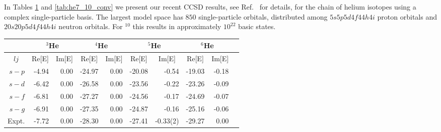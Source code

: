 \documentclass{ws-procs975x65}
\begin{document}
In Tables  \ref{tab:he3_6_conv} and \ref{tab:he7_10_conv}  we present our recent CCSD results, 
see Ref.~\cite{hagen3} for details, 
for the chain
of helium isotopes using a complex single-particle basis.   The largest model space has
$850$ single-particle orbitals, distributed among $5s5p5d4f44h4i$ proton orbitals
and  $20s20p5d4f44h4i$ neutron orbitals. For $^{10}$ this results in approximately $10^{22}$ basic states. 
\begin{table}
    {\begin{tabular}{rrrrrrrrrr}
      \multicolumn{1}{c}{} & \multicolumn{2}{c}{ $^3$He} & \multicolumn{2}{c}{ $^4$He}
      & \multicolumn{2}{c}{ $^5$He} & \multicolumn{2}{c}{ $^6$He} \\
      \hline
      \multicolumn{1}{c}{ $lj$} & \multicolumn{1}{c}{Re[E]}&\multicolumn{1}{c}{Im[E]} &
      \multicolumn{1}{c}{Re[E]}&\multicolumn{1}{c}{Im[E]} &
      \multicolumn{1}{c}{Re[E]}&\multicolumn{1}{c}{Im[E]} &
      \multicolumn{1}{c}{Re[E]}&\multicolumn{1}{c}{Im[E]} & \\
      \hline
      $s-p$ & -4.94 & 0.00 & -24.97 & 0.00 & -20.08 & -0.54 & -19.03 & -0.18  \\
      $s-d $& -6.42 & 0.00 & -26.58 & 0.00 & -23.56 & -0.22 & -23.26 & -0.09 \\
      $s-f$ & -6.81 & 0.00 & -27.27  & 0.00 & -24.56 & -0.17 & -24.69 & -0.07   \\   
      $s-g$ & -6.91 & 0.00 & -27.35 & 0.00 & -24.87 & -0.16 & -25.16 & -0.06  \\  
      \hline 
      Expt. & -7.72 & 0.00 & -28.30 & 0.00 & -27.41 & -0.33(2) & -29.27 & 0.00 \\
   \end{tabular}}  \label{tab:he3_6_conv} 
\end{table} 
\end{document}
